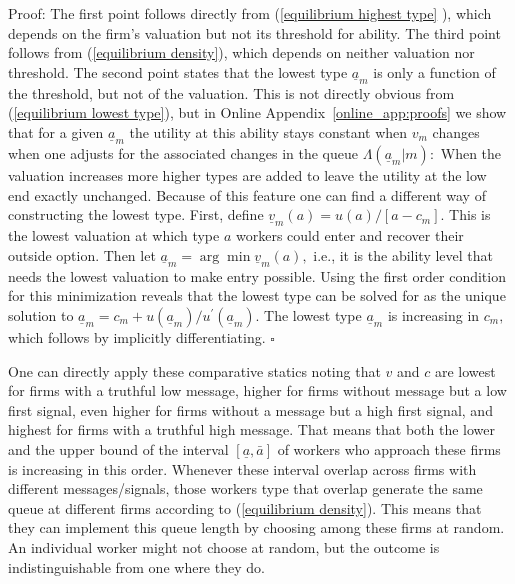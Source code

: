 \documentclass[12pt]{article}
\begin{document}
Proof: The first point follows directly from (\ref{equilibrium highest type}%
), which depends on the firm's valuation but not its threshold for ability.
The third point follows from (\ref{equilibrium density}), which depends on
neither valuation nor threshold. The second point states that the lowest type $\underline{a}_{m}$ is only a
function of the threshold, but not of the valuation. This is not directly
obvious from (\ref{equilibrium lowest type}), but in Online Appendix~\ref{online_app:proofs} we show
that for a given $\underline{a}_{m}$ the utility at this ability stays
constant when $v_{m}$ changes when one adjusts for the associated changes in
the queue $\Lambda (\underline{a}_{m}|m):$ When the valuation increases more
higher types are added to leave the utility at the low end exactly
unchanged. Because of this feature one can find a different way of
constructing the lowest type. First, define $\underline{v}%
_{m}(a)=u(a)/[a-c_{m}].$ This is the lowest valuation at which type $a$
workers could enter and recover their outside option. Then let $\underline{a}_{m}=\arg \min 
\underline{v}_{m}(a),$ i.e., it is the ability level that needs the lowest
valuation to make entry possible. Using the first order condition for this
minimization reveals that the lowest type can be solved for as the unique
solution to $
\underline{a}_{m}=c_{m}+u(\underline{a}_{m})/u^{\prime }(\underline{a}%
_{m}).$
The lowest type $%
\underline{a}_{m}$ is increasing in $c_{m},$ which follows by implicitly
differentiating. $\square $  

\bigskip

One can directly apply these comparative statics noting that $v$ and $c$ are
lowest for firms with a truthful low message, higher for firms without
message but a low first signal, even higher for firms without a message but
a high first signal, and highest for firms with a truthful high message.
That means that both the lower and the upper bound of the interval $[%
\underline{a},\bar{a}]$ of workers who approach these firms is increasing in
this order. Whenever these interval overlap across firms with different
messages/signals, those workers type that overlap generate the same queue at
different firms according to (\ref{equilibrium density}). This means that
they can implement this queue length by choosing among these firms at
random. An individual worker might not choose at random, but the outcome is
indistinguishable from one where they do.
\end{document}
